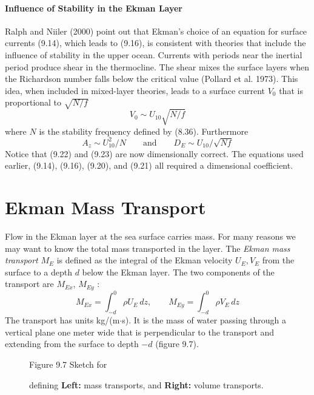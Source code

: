 \paragraph{Influence of Stability in the Ekman Layer}
Ralph and Niiler (2000) point out that
Ekman's choice of an equation for surface currents (9.14), which leads to (9.16), is
consistent with theories that include the influence of stability in the upper ocean.
Currents with periods near the inertial period produce shear in
the thermocline. The shear mixes the surface layers when
the Richardson number falls below the critical value (Pollard et al. 1973). This idea, when
included in mixed-layer theories, leads to a surface current $V_0$ that is proportional to
$\sqrt{N/f}$
\begin{equation}
V_0 \sim U_{10}  \sqrt{N/f}
\end{equation}
where $N$ is the stability frequency defined by (8.36). Furthermore
\begin{equation}
A_z \sim U_{10}^2 / N \qquad \text{and} \qquad D_E \sim U_{10} / \sqrt{Nf}
\end{equation}
Notice that (9.22) and (9.23) are now dimensionally correct. The equations used
earlier, (9.14), (9.16), (9.20), and (9.21) all required a dimensional
coefficient.

\section{Ekman Mass Transport}
  Flow in the Ekman layer at the sea surface carries mass. For many reasons we may
want to know the total mass transported in the layer. The \textit{Ekman mass transport} $M_E$ is
defined as the integral of the Ekman velocity $U_E, V_E$ from the surface to a depth
$d$ below the Ekman layer. The two components of the transport are $M_{Ex}$, $M_{Ey}$ :
\begin{equation}
M_{Ex} = \int^0_{-d} \rho U_E \, dz, \qquad
M_{Ey} = \int^0_{-d} \rho V_E \, dz
\end{equation}
The transport has units kg/(m$\cdot$s). It is the mass of water passing
through a vertical plane one meter wide that is perpendicular to the
transport and extending from the surface to depth $-d$ (figure 9.7).

\begin{figure}[h!]
\vspace{-2ex}
\centering
\footnotesize
Figure 9.7 Sketch for \rule{0mm}{3ex}defining \textbf{Left:} mass
transports, and
\textbf{Right:} volume transports.
\label{fig:transportsketch}
\end{figure}

